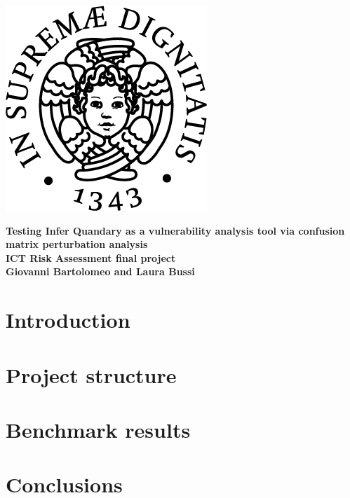 \documentclass{article}
\begin{document}
\begin{titlepage}
\begin{center}
\includegraphics[scale=0.5]{unipi.png}
\end{center}

\begin{center}
	\vspace{5mm}
    {\LARGE{\bf Testing Infer Quandary as a vulnerability analysis tool 
via confusion matrix perturbation analysis}}\\
    \vspace{5mm}
    {\large{\bf ICT Risk Assessment final project}}\\
    \vspace{2.5mm}
	{\large{\bf Giovanni Bartolomeo and Laura Bussi}}\\
\end{center}
\end{titlepage}

\section{Introduction}\label{sec:intro}



\section{Project structure}\label{sec:project}



\section{Benchmark results}\label{sec:results}



\section{Conclusions}\label{sec:conclusions}


\end{document}
